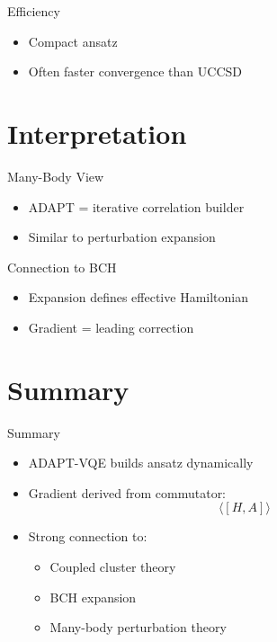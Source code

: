 \documentclass{beamer}
\begin{document}

\begin{frame}{Efficiency}
\begin{itemize}
\item Compact ansatz
\item Often faster convergence than UCCSD
\end{itemize}
\end{frame}

\section{Interpretation}

\begin{frame}{Many-Body View}
\begin{itemize}
\item ADAPT = iterative correlation builder
\item Similar to perturbation expansion
\end{itemize}
\end{frame}


\begin{frame}{Connection to BCH}
\begin{itemize}
\item Expansion defines effective Hamiltonian
\item Gradient = leading correction
\end{itemize}
\end{frame}

\section{Summary}

\begin{frame}{Summary}
\begin{itemize}
\item ADAPT-VQE builds ansatz dynamically
\item Gradient derived from commutator:
\[
\langle [H,A] \rangle
\]
\item Strong connection to:
\begin{itemize}
\item Coupled cluster theory
\item BCH expansion
\item Many-body perturbation theory
\end{itemize}
\end{itemize}
\end{frame}
\end{document}
